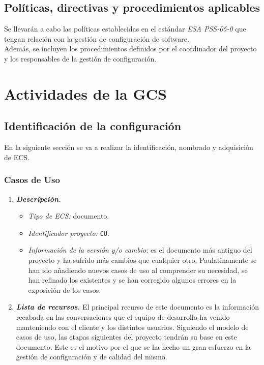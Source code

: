 \documentclass[11pt, a4paper, twoside, titlepage]{article}
\begin{document}
		\subsection{Políticas, directivas y procedimientos aplicables}
			Se llevarán a cabo las políticas establecidas en el estándar \textit{ESA PSS-05-0} \cite{ESAPSS-05-0} que tengan relación con la gestión de configuración de software. \\

			Además, se incluyen los procedimientos definidos por el coordinador del proyecto y los responsables de la gestión de configuración.

	\section{Actividades de la GCS}
		\subsection{Identificación de la configuración} %
			En la siguiente sección se va a realizar la identificación, nombrado y adquisición de \gls{ECS}.

			\subsubsection{Casos de Uso}
				\begin{enumerate}
					\item {\itshape \bfseries Descripción.}
						\begin{itemize}
							\item \textit{Tipo de ECS:} documento.
							\item \textit{Identificador proyecto:} \verb|CU|.
							\item \textit{Información de la versión y/o cambio:} es el documento más antiguo del proyecto y ha sufrido más cambios que cualquier otro. Paulatinamente se han ido añadiendo nuevos casos de uso al comprender su necesidad, se han refinado los existentes y se han corregido algunos errores en la exposición de los casos.
						\end{itemize}

					\item {\itshape \bfseries Lista de recursos.}
						El principal recurso de este documento es la información recabada en las conversaciones que el equipo de desarrollo ha venido manteniendo con el cliente y los distintos usuarios. Siguiendo el modelo de casos de uso, las etapas siguientes del proyecto tendrán su base en este documento. Este es el motivo por el que se ha hecho un gran esfuerzo en la gestión de configuración y de calidad del mismo.

				\end{enumerate}
\end{document}
